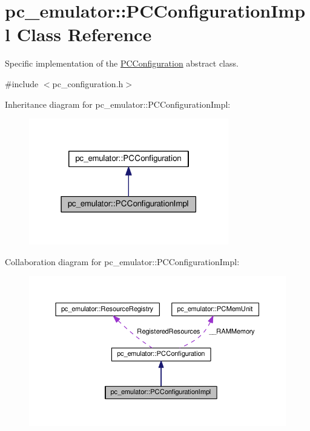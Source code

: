 \hypertarget{classpc__emulator_1_1PCConfigurationImpl}{}\section{pc\+\_\+emulator\+:\+:P\+C\+Configuration\+Impl Class Reference}
\label{classpc__emulator_1_1PCConfigurationImpl}


Specific implementation of the \hyperlink{classpc__emulator_1_1PCConfiguration}{P\+C\+Configuration} abstract class.  




{\ttfamily \#include $<$pc\+\_\+configuration.\+h$>$}



Inheritance diagram for pc\+\_\+emulator\+:\+:P\+C\+Configuration\+Impl\+:
\nopagebreak
\begin{figure}[H]
\begin{center}
\leavevmode
\includegraphics[width=247pt]{classpc__emulator_1_1PCConfigurationImpl__inherit__graph}
\end{center}
\end{figure}


Collaboration diagram for pc\+\_\+emulator\+:\+:P\+C\+Configuration\+Impl\+:
\nopagebreak
\begin{figure}[H]
\begin{center}
\leavevmode
\includegraphics[width=350pt]{classpc__emulator_1_1PCConfigurationImpl__coll__graph}
\end{center}
\end{figure}
